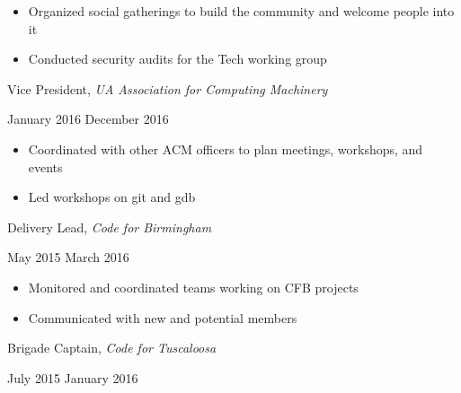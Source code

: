 \documentclass[11pt]{article}
\begin{document}
\begin{itemize}
  \item Organized social gatherings to build the community and welcome people into it
  \item Conducted security audits for the Tech working group
\end{itemize}

\vspace{0.4em}
\begin{minipage}[t]{0.65\textwidth}
\flushleft
Vice President, \textit{UA Association for Computing Machinery}\\
\end{minipage}
\begin{minipage}[t]{0.30\textwidth}
\flushright
January 2016 \space \textemdash \space December 2016\\
\end{minipage}

\begin{itemize}
  \item Coordinated with other ACM officers to plan meetings, workshops, and events
  \item Led workshops on git and gdb
\end{itemize}

\vspace{0.4em}
\begin{minipage}[t]{0.65\textwidth}
\flushleft
Delivery Lead, \textit{Code for Birmingham}\\
\end{minipage}
\begin{minipage}[t]{0.30\textwidth}
\flushright
May 2015 \space \textemdash \space March 2016\\
\end{minipage}

\begin{itemize}
  \item Monitored and coordinated teams working on CFB projects
  \item Communicated with new and potential members
\end{itemize}

\begin{minipage}[t]{0.65\textwidth}
\flushleft
Brigade Captain, \textit{Code for Tuscaloosa}\\
\end{minipage}
\begin{minipage}[t]{0.30\textwidth}
\flushright
July 2015 \space \textemdash \space January 2016\\
\end{minipage}
\end{document}
